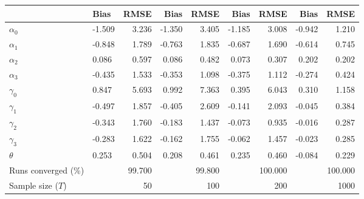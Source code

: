 
\begin{tabular}[t]{llrrrrrrr}
\toprule
  & Bias & RMSE & Bias & RMSE & Bias & RMSE & Bias & RMSE\\
\midrule
$\alpha_{0}$ & -1.509 & 3.236 & -1.350 & 3.405 & -1.185 & 3.008 & -0.942 & 1.210\\
$\alpha_{1}$ & -0.848 & 1.789 & -0.763 & 1.835 & -0.687 & 1.690 & -0.614 & 0.745\\
$\alpha_{2}$ & 0.086 & 0.597 & 0.086 & 0.482 & 0.073 & 0.307 & 0.202 & 0.202\\
$\alpha_{3}$ & -0.435 & 1.533 & -0.353 & 1.098 & -0.375 & 1.112 & -0.274 & 0.424\\
$\gamma_{0}$ & 0.847 & 5.693 & 0.992 & 7.363 & 0.395 & 6.043 & 0.310 & 1.158\\
$\gamma_{1}$ & -0.497 & 1.857 & -0.405 & 2.609 & -0.141 & 2.093 & -0.045 & 0.384\\
$\gamma_{2}$ & -0.343 & 1.760 & -0.183 & 1.437 & -0.073 & 0.935 & -0.016 & 0.287\\
$\gamma_{3}$ & -0.283 & 1.622 & -0.162 & 1.755 & -0.062 & 1.457 & -0.023 & 0.285\\
$\theta$ & 0.253 & 0.504 & 0.208 & 0.461 & 0.235 & 0.460 & -0.084 & 0.229\\
Runs converged (\%) &  & 99.700 &  & 99.800 &  & 100.000 &  & 100.000\\
Sample size ($T$) &  & 50 &  & 100 &  & 200 &  & 1000\\
\bottomrule
\end{tabular}
